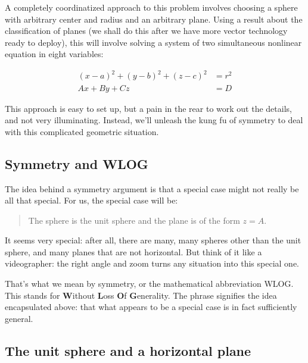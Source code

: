 \documentclass[12pt]{exam}
\theoremstyle{definition}
\begin{document}
A completely coordinatized approach to this problem involves choosing a
sphere with arbitrary center and radius and an arbitrary plane. Using a
result about the classification of planes (we shall do this after we
have more vector technology ready to deploy), this will involve solving
a system of two simultaneous nonlinear equation in eight variables:

\begin{align*}
    (x - a)^2 + (y - b)^2 + (z - c)^2 &= r^2 \\
    Ax + By + Cz &= D 
\end{align*}

This approach is easy to set up, but a pain in the rear to work out the
details, and not very illuminating. Instead, we'll unleash the kung fu
of symmetry to deal with this complicated geometric situation.

\subsection{Symmetry and WLOG}

The idea behind a symmetry argument is that a special case might not
really be all that special. For us, the special case will be:

\begin{quote}
The sphere is the unit sphere and the plane is of the form $z = A$.
\end{quote}

It seems very special: after all, there are many, many spheres other
than the unit sphere, and many planes that are not horizontal. But think
of it like a videographer: the right angle and zoom turns any situation
into this special one.

That's what we mean by symmetry, or the mathematical abbreviation WLOG.
This stands for \textbf{W}ithout \textbf{L}oss \textbf{O}f
\textbf{G}enerality. The phrase signifies the idea encapsulated above:
that what appears to be a special case is in fact sufficiently general.

\subsection{The unit sphere and a horizontal plane}
\end{document}
